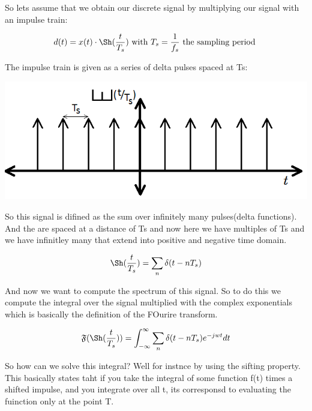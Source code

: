 So lets assume that we obtain our discrete signal by multiplying our signal with an impulse train:

\begin{equation*}\discFunc(\sampTime) = \contFunc(\sampTime)\cdot\Sh(\frac{\sampTime} {\samplingPeriod})\text{          with \begin{math}\samplingPeriod = \frac{1}{\samplingFreq}\end{math} the sampling period }\end{equation*}

The impulse train is given as a series of delta pulses spaced at Ts:

\includegraphics[width=0.5\linewidth]{Pictures/Chapter_2_Lesson_1/Sampling1.png}

So this signal is difined as the sum over infinitely many pulses(delta functions). And the are spaced at a distance of Ts and now here we have multiples of Ts and we have infinitley many that extend into positive and negative time domain.
 
 \begin{equation*}\Sh(\frac{\sampTime} {\samplingPeriod}) = \sum_{\sampIndex}\deltaPulse(\sampTime - \sampIndex\samplingPeriod) \end{equation*}
 
 And now we want to compute the spectrum of this signal.  So to do this we compute the integral over the signal multiplied with the complex exponentials which is basically the definition of the FOurire transform.
 
  \begin{equation*}\fourierSym( \Sh(\frac{\sampTime} {\samplingPeriod})) = \int^{\infty}_{-\infty}\sum_{\sampIndex}\deltaPulse(\sampTime - \sampIndex\samplingPeriod)e^{-jwt}dt  \end{equation*}
 
So how can we solve this integral? Well for instnce by using the sifting property.  This basically states taht if you take the integral of some function f(t) times a shifted impulse, and you integrate over all t, its corresponsd to evaluating the fuinction only at the point T.


